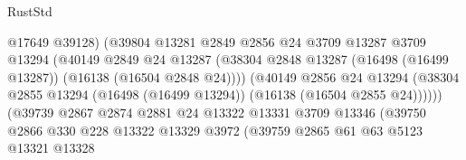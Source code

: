 \begin{lexlean}{RustStd}
\begin{coremodule}
                                          @17649
                                          @39128)
                                        (@39804
                                          @13281
                                          @2849
                                          @2856
                                          @24
                                          @3709
                                          @13287
                                          @3709
                                          @13294
                                          (@40149
                                            @2849
                                            @24
                                            @13287
                                            (@38304
                                              @2848
                                              @13287
                                              (@16498 (@16499 @13287))
                                              (@16138 (@16504 @2848 @24))))
                                          (@40149
                                            @2856
                                            @24
                                            @13294
                                            (@38304
                                              @2855
                                              @13294
                                              (@16498 (@16499 @13294))
                                              (@16138 (@16504 @2855 @24))))))
                                      (@39739
                                        @2867
                                        @2874
                                        @2881
                                        @24
                                        @13322
                                        @13331
                                        @3709
                                        @13346
                                        (@39750
                                          @2866
                                          @330
                                          @228
                                          @13322
                                          @13329
                                          @3972
                                          (@39759
                                            @2865
                                            @61
                                            @63
                                            @5123
                                            @13321
                                            @13328

\end{coremodule}
\end{lexlean}
